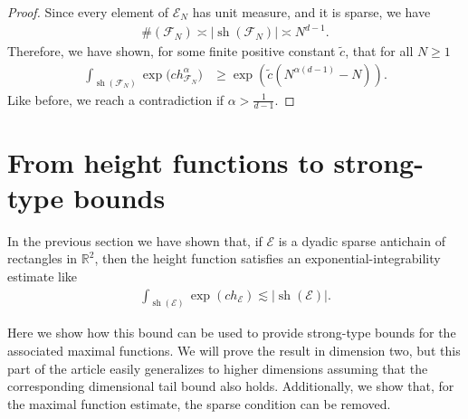\documentclass[oneside]{amsart}
\theoremstyle{definition}
\theoremstyle{plain}
\numberwithin{equation}{section}
\numberwithin{theorem}{section}
\newcommand{\sh}{\operatorname{sh}}
\begin{document}
\begin{proof}
  Since every element of $\mathcal{E}_N$ has unit measure, and it is sparse, we
  have
  \begin{align*}
    \#(\mathcal{F}_N) \asymp |\sh(\mathcal{F}_N)| \asymp N^{d-1}.
  \end{align*}
  Therefore, we have shown, for some finite positive constant $\widetilde{c}$,
  that for all $N \geq 1$
  \begin{align*}
    \int_{\sh(\mathcal{F}_N)} \exp\big(c h_{\mathcal{F}_N}^\alpha \big)
    &\geq \exp(\widetilde{c}(N^{\alpha(d-1)}-N)).
  \end{align*}
  Like before, we reach a contradiction if $\alpha > \frac{1}{d-1}$.
\end{proof}


\section{From height functions to strong-type bounds} \label{sec:strong_type}

In the previous section we have shown that, if $\mathcal{E}$ is a dyadic sparse
antichain of rectangles in $\mathbb{R}^2$, then the height function satisfies
an exponential-integrability estimate like
\begin{align*}
  \int_{\sh(\mathcal{E})} \exp(ch_{\mathcal{E}}) \lesssim |\sh(\mathcal{E})|.
\end{align*}

Here we show how this bound can be used to provide strong-type bounds for
the associated maximal functions.
We will prove the result in dimension two, but this part of the article
easily generalizes to higher dimensions assuming that the corresponding
dimensional tail bound also holds.
Additionally, we show that, for the maximal function estimate, the sparse
condition can be removed.
\end{document}
